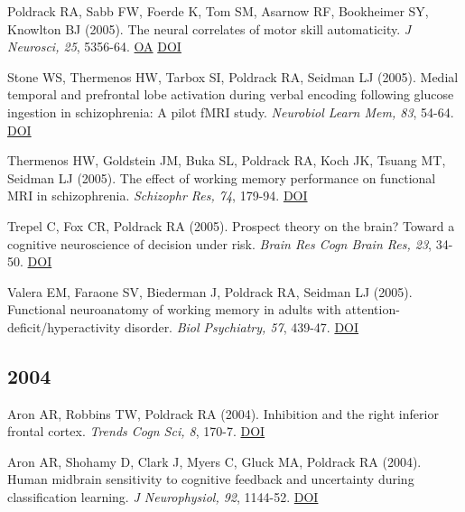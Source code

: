 \documentclass[10pt, letterpaper]{article}
\begin{document}
Poldrack RA, Sabb FW, Foerde K, Tom SM, Asarnow RF, Bookheimer SY, Knowlton BJ (2005). The neural correlates of motor skill automaticity. \textit{J Neurosci, 25}, 5356-64. \href{https://www.ncbi.nlm.nih.gov/pmc/articles/PMC6725010}{OA} \href{http://dx.doi.org/10.1523/jneurosci.3880-04.2005}{DOI} \vspace{2mm}

Stone WS, Thermenos HW, Tarbox SI, Poldrack RA, Seidman LJ (2005). Medial temporal and prefrontal lobe activation during verbal encoding following glucose ingestion in schizophrenia: A pilot fMRI study. \textit{Neurobiol Learn Mem, 83}, 54-64. \href{http://dx.doi.org/10.1016/j.nlm.2004.07.009}{DOI} \vspace{2mm}

Thermenos HW, Goldstein JM, Buka SL, Poldrack RA, Koch JK, Tsuang MT, Seidman LJ (2005). The effect of working memory performance on functional MRI in schizophrenia. \textit{Schizophr Res, 74}, 179-94. \href{http://dx.doi.org/10.1016/j.schres.2004.07.021}{DOI} \vspace{2mm}

Trepel C, Fox CR, Poldrack RA (2005). Prospect theory on the brain? Toward a cognitive neuroscience of decision under risk. \textit{Brain Res Cogn Brain Res, 23}, 34-50. \href{http://dx.doi.org/10.1016/j.cogbrainres.2005.01.016}{DOI} \vspace{2mm}

Valera EM, Faraone SV, Biederman J, Poldrack RA, Seidman LJ (2005). Functional neuroanatomy of working memory in adults with attention-deficit/hyperactivity disorder. \textit{Biol Psychiatry, 57}, 439-47. \href{http://dx.doi.org/10.1016/j.biopsych.2004.11.034}{DOI} \vspace{2mm}

\subsection*{2004}Aron AR, Robbins TW, Poldrack RA (2004). Inhibition and the right inferior frontal cortex. \textit{Trends Cogn Sci, 8}, 170-7. \href{http://dx.doi.org/10.1016/j.tics.2004.02.010}{DOI} \vspace{2mm}

Aron AR, Shohamy D, Clark J, Myers C, Gluck MA, Poldrack RA (2004). Human midbrain sensitivity to cognitive feedback and uncertainty during classification learning. \textit{J Neurophysiol, 92}, 1144-52. \href{http://dx.doi.org/10.1152/jn.01209.2003}{DOI} \vspace{2mm}
\end{document}
